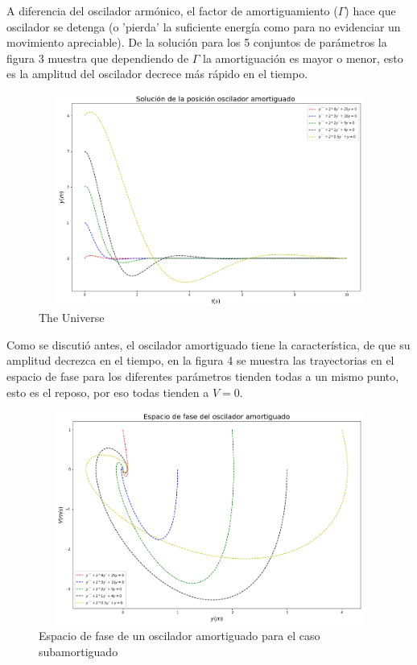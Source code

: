 \documentclass{article}
\begin{document}
\noindent A diferencia del oscilador armónico, el factor de amortiguamiento ($\Gamma$) hace que oscilador se detenga (o 'pierda' la suficiente energía como para no evidenciar un movimiento apreciable). De la solución para los 5 conjuntos de parámetros la figura 3 muestra que dependiendo de $\Gamma$ la amortiguación es mayor o menor, esto es la amplitud del oscilador decrece más rápido en el tiempo.
\newline
\newline


\begin{figure}[h!]
\centering
\includegraphics[width=12cm,height=7cm]{output_5_1.png}
\caption{The Universe}
\label{fig:universe}
\end{figure}

Como se discutió antes, el oscilador amortiguado tiene la característica, de que su amplitud decrezca en el tiempo, en la figura 4 se muestra  las trayectorias en el espacio de fase para los diferentes parámetros tienden todas a un mismo punto, esto  es el reposo, por eso todas tienden a $V=0$.


\begin{figure}[h!]
\centering
\includegraphics[width=12cm,height=7cm]{output_7_1.png}
\caption{Espacio de fase de un oscilador amortiguado para el caso subamortiguado}
\label{fig:universe}
\end{figure}
\end{document}
